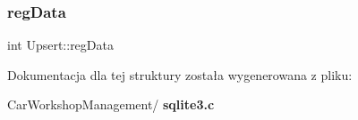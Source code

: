 \mbox{\label{struct_upsert_ae04e06c0d34138e9f77c8d1a56322aa9}} 
\subsubsection{regData}
{\footnotesize\ttfamily int Upsert\+::reg\+Data}



Dokumentacja dla tej struktury została wygenerowana z pliku\+:\begin{DoxyCompactItemize}
\item 
Car\+Workshop\+Management/\textbf{ sqlite3.\+c}\end{DoxyCompactItemize}

